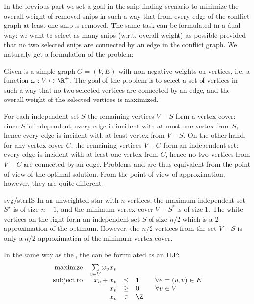 \noindent
In the previous part we set a goal in the snip-finding scenario to minimize the overall weight of 
removed snips in such a way that from every edge of the conflict graph  at least one snip is removed. 
The same task can be formulated in a dual way: we want to select as many snips (w.r.t. overall weight) as
possible provided that no two selected snips are connected by an edge in the conflict graph.
We naturally get a formulation of the \maxis problem:

\begin{framed}
  \begin{dfn}
Given is a simple graph $G=(V,E)$ with non-negative weights on vertices, i.e. a function
$\omega:V\mapsto\R^+$. The goal of the problem \maxis is to select a set of vertices in
such a way that no two selected vertices are connected by an edge, and the overall weight of the 
selected vertices is maximized.
\end{dfn}
\end{framed}

\noindent
For each independent set $S$ the remaining vertices $V-S$ form a vertex cover: since $S$ is independent,
every edge is incident with at most one vertex from $S$, hence every edge is incident with at least vertex 
from $V-S$. On the other hand, for any vertex cover $C$, the remaining vertices $V-C$ form an independent set:
every edge is incident with at least one vertex from $C$, hence no two vertices from $V-C$ are connected by an edge.
Problems \minvcover and \maxis are thus equivalent from the point of view of the optimal solution. From the point of 
view of approximation, however, they are quite different. 

\begin{myfig}{0.6\textwidth}{svg/starIS}
  In an unweighted star with $n$ vertices, the maximum independent set  $S^\star$ is of size $n-1$, and
  the minimum vertex cover  $V-S^*$ is of size $1$. The white vertices on the right form an independent set $S$ of
  size $n/2$ which is a 2-approximation of the optimum. However, the $n/2$ vertices from the set $V-S$ is only a
  $n/2$-approximation of the minimum vertex cover. 
\end{myfig}

\noindent
In the same way as the \minvcover, the \maxis can be formulated as an ILP:
\begin{equation}
\label{eq:ILP:a1}
\begin{array}{rrcll}
  {\rm maximize}     & \multicolumn{1}{l}{\sum\limits_{v\in V}\omega_vx_v}\\
  {\rm subject\ to} & x_u + x_v&\le&1& \;\;\;\forall e=(u,v)\in E\\
                          & x_v&\ge&0& \;\;\;\forall v\in V\\
                          & x_v&\in&\Z
\end{array}
\end{equation}

